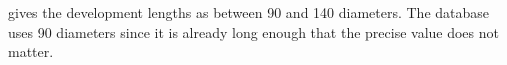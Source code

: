\citet[p.~202]{StantonTE+1914+eng+JOUR} gives the development lengths as
between 90 and 140 diameters.  The database uses 90 diameters since it is
already long enough that the precise value does not matter.
